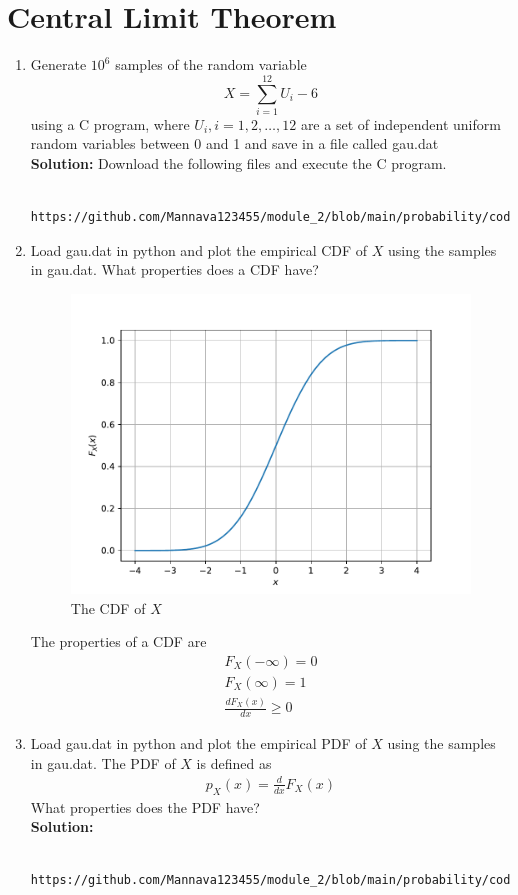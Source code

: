 \documentclass[journal,10pt,twocolumn]{IEEEtran}
\newcommand{\solution}{\noindent \textbf{Solution: }}
\begin{document}
\section{Central Limit Theorem}
\begin{enumerate}
%
%
\item
Generate $10^6$ samples of the random variable
%
\begin{equation}
X = \sum_{i=1}^{12}U_i -6
\end{equation}
%
using a C program, where $U_i, i = 1,2,\dots, 12$ are  a set of independent uniform random variables between 0 and 1
and save in a file called gau.dat\\
\solution Download the following files and execute the  C program.
\begin{lstlisting}
	https://github.com/Mannava123455/module_2/blob/main/probability/codes/chapter_2/2_2.c
\end{lstlisting}
%
\item
Load gau.dat in python and plot the empirical CDF of $X$ using the samples in gau.dat. What properties does a CDF have?
\\
\begin{figure}[H]
\centering
\includegraphics[width=\columnwidth]{gauss_cdf.pdf}
\caption{The CDF of $X$}
\label{fig:gauss_cdf}
\end{figure}
The properties of a CDF are
\begin{eqnarray}
	F_X(-\infty) = 0\\
	F_X(\infty) = 1\\
	\frac{dF_X(x)}{dx} \ge 0
\end{eqnarray}
\item
Load gau.dat in python and plot the empirical PDF of $X$ using the samples in gau.dat. The PDF of $X$ is defined as
\begin{align}
p_{X}(x) = \frac{d}{dx}F_{X}(x)
\label{eq:cdf_to_pdf}
\end{align}
What properties does the PDF have?
\\
\solution 
\begin{lstlisting}
	https://github.com/Mannava123455/module_2/blob/main/probability/codes/chapter_2/2_2_pdf.py
\end{lstlisting}


\end{enumerate}
\end{document}
